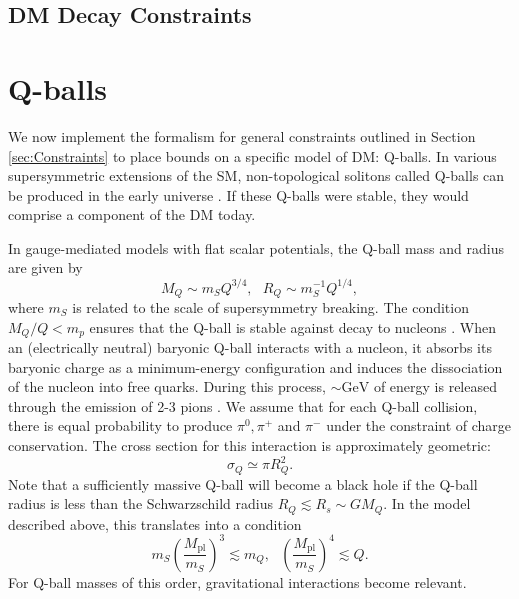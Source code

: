 \documentclass[twocolumn,showpacs,preprintnumbers,amsmath,amssymb,prd]{revtex4}
\newcommand{\Mpl}{M_{\text{pl}}}
\def\r{\right)}
\def\l{\left(}
\begin{document}
\subsection{DM Decay Constraints}
\label{sec:DecayConstraints}




\section{Q-balls}
\label{sec:ConcreteExamples}

We now implement the formalism for general constraints outlined in Section \ref{sec:Constraints} to place bounds on a specific model of DM: Q-balls. In various supersymmetric extensions of the SM, non-topological solitons called Q-balls can be produced in the early universe \cite{Coleman:1985ki, Kusenko:1997si}. If these Q-balls were stable, they would comprise a component of the DM today.

In gauge-mediated models with flat scalar potentials, the Q-ball mass and radius are given by
\begin{equation}
\label{eq:Qballprop}
M_Q \sim m_S Q^{3/4}, ~~~ R_Q \sim m_S^{-1} Q^{1/4},
\end{equation}
where $m_S$ is related to the scale of supersymmetry breaking. The condition $M_Q/Q < m_p$ ensures that the Q-ball is stable against decay to nucleons \cite{Dine:2003ax}. When an (electrically neutral) baryonic Q-ball interacts with a nucleon, it absorbs its baryonic charge as a minimum-energy configuration and induces the dissociation of the nucleon into free quarks. During this process, $\sim \text{GeV}$ of energy is released through the emission of 2-3 pions \cite{Dine:2003ax}. We assume that for each Q-ball collision, there is equal probability to produce $\pi^0, \pi^+$ and $\pi^-$ under the constraint of charge conservation. The cross section for this interaction is approximately geometric:
\begin{equation}
\sigma_Q \simeq \pi R_Q^2.
\end{equation}
Note that a sufficiently massive Q-ball will become a black hole if the Q-ball radius is less than the Schwarzschild radius $R_Q \lesssim R_s \sim G M_Q$. In the model described above, this translates into a condition
\begin{equation}
m_S \l\frac{\Mpl}{m_S}\r^3 \lesssim m_Q, ~~~ \l\frac{\Mpl}{m_S}\r^4 \lesssim Q.
\end{equation}
For Q-ball masses of this order, gravitational interactions become relevant.
\end{document}
